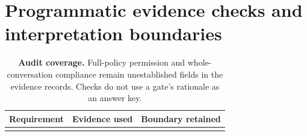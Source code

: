 \section{Programmatic evidence checks and interpretation
boundaries}\label{programmatic-evidence-checks-and-interpretation-boundaries}

\begin{table}[htbp]
\centering
\small
\caption{\textbf{Audit coverage.} Full-policy permission and
whole-conversation compliance remain unestablished fields in the
evidence records. Checks do not use a gate's rationale as an answer
key.}
\begin{tabular}{@{}
  >{\raggedright\arraybackslash}p{}
  >{\raggedright\arraybackslash}p{}
  >{\raggedright\arraybackslash}p{}@{}}
\toprule\noalign{}
\begin{minipage}[b]{\linewidth}\raggedright
Requirement
\end{minipage} & \begin{minipage}[b]{\linewidth}\raggedright
Evidence used
\end{minipage} & \begin{minipage}[b]{\linewidth}\raggedright
Boundary retained
\end{minipage} \\
\midrule\noalign{}


\end{tabular}
\end{table}
